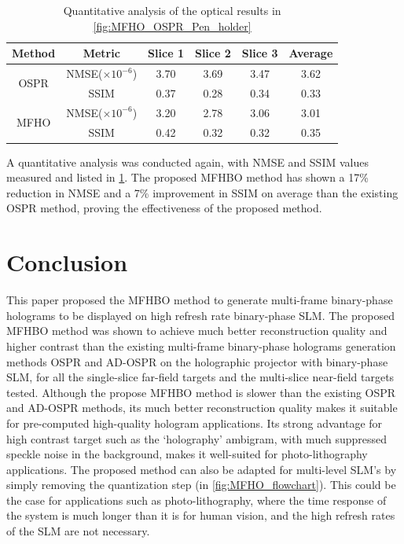 	\begin{table}[H]
	\centering
	\begin{tabular}{|c|c|c|c|c|c|}
	\hline
	\textbf{Method} & \textbf{Metric} & \textbf{Slice 1} & \textbf{Slice 2} & \textbf{Slice 3} & \textbf{Average} \\ \hline
	\multirow{2}{*}{OSPR} & NMSE($\times 10^{-6}$) & 3.70 & 3.69 & 3.47 & 3.62 \\ \cline{2-6}
						  & SSIM                   & 0.37 & 0.28 & 0.34 & 0.33 \\ \hline
	\multirow{2}{*}{MFHO} & NMSE($\times 10^{-6}$) & 3.20 & 2.78 & 3.06 & 3.01 \\ \cline{2-6}
						  & SSIM                   & 0.42 & 0.32 & 0.32 & 0.35 \\ \hline
	\end{tabular}
	\caption{Quantitative analysis of the optical results in \cref{fig:MFHO_OSPR_Pen_holder}}
	\label{tab:quant_MFHO_Pen_holder}
	\end{table}

	A quantitative analysis was conducted again, with NMSE and SSIM values measured and listed in \cref{tab:quant_MFHO_Pen_holder}. The proposed MFHBO method has shown a 17\% reduction in NMSE and a 7\% improvement in SSIM on average than the existing OSPR method, proving the effectiveness of the proposed method.


\section{Conclusion}
	This paper proposed the MFHBO method to generate multi-frame binary-phase holograms to be displayed on high refresh rate binary-phase SLM. The proposed MFHBO method was shown to achieve much better reconstruction quality and higher contrast than the existing multi-frame binary-phase holograms generation methods OSPR \cite{Cable2004} and AD-OSPR \cite{Kaczorowski2016} on the holographic projector with binary-phase SLM, for all the single-slice far-field targets and the multi-slice near-field targets tested. Although the propose MFHBO method is slower than the existing OSPR and AD-OSPR methods, its much better reconstruction quality makes it suitable for pre-computed high-quality hologram applications. Its strong advantage for high contrast target such as the `holography' ambigram, with much suppressed speckle noise in the background, makes it well-suited for photo-lithography applications. The proposed method can also be adapted for multi-level SLM's by simply removing the quantization step (in \cref{fig:MFHO_flowchart}). This could be the case for applications such as photo-lithography, where the time response of the system is much longer than it is for human vision, and the high refresh rates of the SLM are not necessary.
